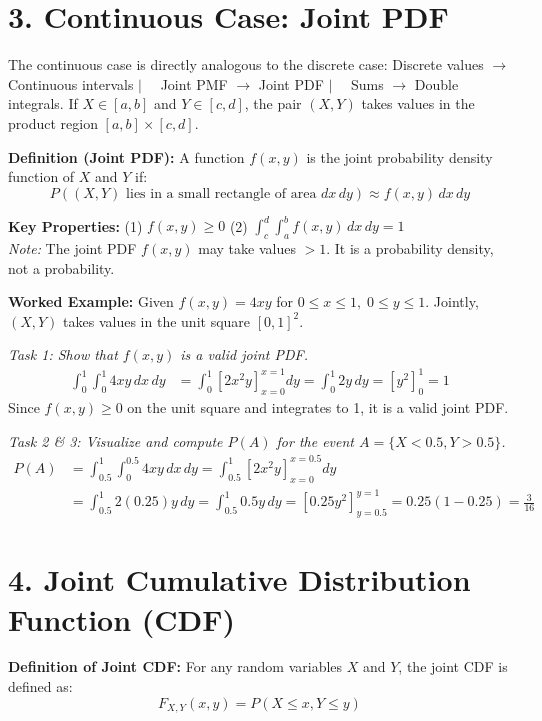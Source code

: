 \documentclass{article}
\begin{document}
\section*{3. Continuous Case: Joint PDF}
The continuous case is directly analogous to the discrete case: 
Discrete values $\longrightarrow$ Continuous intervals \quad $|\quad$ Joint PMF $\longrightarrow$ Joint PDF \quad $|\quad$ Sums $\longrightarrow$ Double integrals.
If $X \in [a, b]$ and $Y \in [c, d]$, the pair $(X, Y)$ takes values in the product region $[a, b] \times [c, d]$.

\textbf{Definition (Joint PDF):} A function $f(x,y)$ is the joint probability density function of $X$ and $Y$ if:
\begin{equation*}
P((X, Y) \text{ lies in a small rectangle of area } dx\,dy) \approx f(x, y) \,dx\,dy
\end{equation*}

\textbf{Key Properties:}
\quad (1) $f(x, y) \ge 0$ \qquad (2) $\int_{c}^{d} \int_{a}^{b} f(x, y) \,dx\,dy = 1$ \\
\textit{Note:} The joint PDF $f(x,y)$ may take values $> 1$. It is a probability density, not a probability.

\textbf{Worked Example:}
Given $f(x, y) = 4xy$ for $0 \le x \le 1, \; 0 \le y \le 1$. Jointly, $(X, Y)$ takes values in the unit square $[0, 1]^2$.

\textit{Task 1: Show that $f(x, y)$ is a valid joint PDF.}
\begin{align*}
\int_{0}^{1} \int_{0}^{1} 4xy \,dx\,dy &= \int_{0}^{1} \left[ 2x^2 y \right]_{x=0}^{x=1} dy = \int_{0}^{1} 2y \,dy = \left[ y^2 \right]_{0}^{1} = 1
\end{align*}
Since $f(x,y) \ge 0$ on the unit square and integrates to 1, it is a valid joint PDF.

\textit{Task 2 \& 3: Visualize and compute $P(A)$ for the event $A = \{X < 0.5, Y > 0.5\}$.}
\begin{align*}
P(A) &= \int_{0.5}^{1} \int_{0}^{0.5} 4xy \,dx\,dy = \int_{0.5}^{1} \left[ 2x^2 y \right]_{x=0}^{x=0.5} dy \\
&= \int_{0.5}^{1} 2(0.25)y \,dy = \int_{0.5}^{1} 0.5y \,dy = \left[ 0.25y^2 \right]_{y=0.5}^{y=1} = 0.25(1 - 0.25) = \frac{3}{16}
\end{align*}

\section*{4. Joint Cumulative Distribution Function (CDF)}
\textbf{Definition of Joint CDF:} For any random variables $X$ and $Y$, the joint CDF is defined as:
\begin{equation*}
F_{X,Y}(x,y) = P(X \le x, Y \le y)
\end{equation*}
\end{document}
